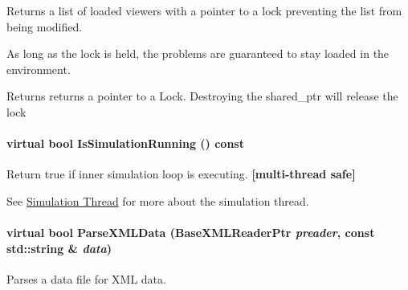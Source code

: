 Returns a list of loaded viewers with a pointer to a lock preventing the list from being modified. 

As long as the lock is held, the problems are guaranteed to stay loaded in the environment. \begin{DoxyReturn}{Returns}
returns a pointer to a Lock. Destroying the shared\_\-ptr will release the lock 
\end{DoxyReturn}
\hypertarget{classOpenRAVE_1_1EnvironmentBase_a0267abbf0177d8ee2570c6a57b59cc39}{
\paragraph[{IsSimulationRunning}]{\setlength{\rightskip}{0pt plus 5cm}virtual bool IsSimulationRunning () const}\hfill}
\label{classOpenRAVE_1_1EnvironmentBase_a0267abbf0177d8ee2570c6a57b59cc39}


Return true if inner simulation loop is executing. {\bfseries \mbox{[}multi-\/thread safe\mbox{]}} 

See \hyperlink{architecture__concepts_arch_simulation}{Simulation Thread} for more about the simulation thread. \hypertarget{classOpenRAVE_1_1EnvironmentBase_a9895152450985d0a439b851d8ec78d7f}{
\paragraph[{ParseXMLData}]{\setlength{\rightskip}{0pt plus 5cm}virtual bool ParseXMLData (BaseXMLReaderPtr {\em preader}, \/  const std::string \& {\em data})}\hfill}
\label{classOpenRAVE_1_1EnvironmentBase_a9895152450985d0a439b851d8ec78d7f}


Parses a data file for XML data. 


